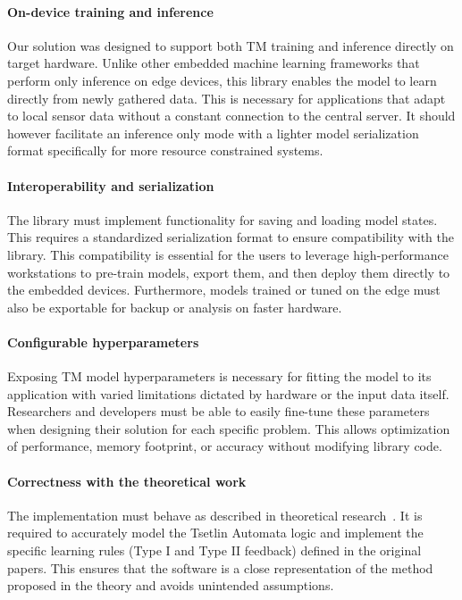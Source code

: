 \paragraph{On-device training and inference}
Our solution was designed to support both TM training and inference directly on target hardware. Unlike other embedded machine learning frameworks that perform only inference on edge devices, this library enables the model to learn directly from newly gathered data. This is necessary for applications that adapt to local sensor data without a constant connection to the central server.
It should however facilitate an inference only mode with a lighter model serialization format specifically for more resource constrained systems.

\paragraph{Interoperability and serialization}
The library must implement functionality for saving and loading model states. This requires a standardized serialization format to ensure compatibility with the \GreenTsetlinName library. This compatibility is essential for the users to leverage high-performance workstations to pre-train models, export them, and then deploy them directly to the embedded devices. Furthermore, models trained or tuned on the edge must also be exportable for backup or analysis on faster hardware.

\paragraph{Configurable hyperparameters}
Exposing TM model hyperparameters is necessary for fitting the model to its application with varied limitations dictated by hardware or the input data itself. Researchers and developers must be able to easily fine-tune these parameters when designing their solution for each specific problem. This allows optimization of performance, memory footprint, or accuracy without modifying library code. 

\paragraph{Correctness with the theoretical work}
The implementation must behave as described in theoretical research~\cite{granmo2021tsetlinmachinegame}. It is required to accurately model the Tsetlin Automata logic and implement the specific learning rules (Type I and Type II feedback) defined in the original papers. This ensures that the software is a close representation of the method proposed in the theory and avoids unintended assumptions.

